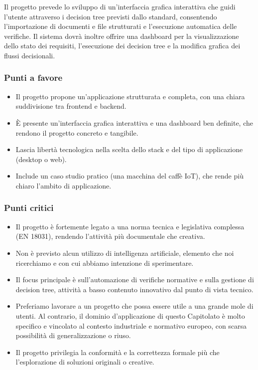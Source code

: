 \documentclass[a4paper,12pt]{article}
\begin{document}
Il progetto prevede lo sviluppo di un’interfaccia grafica interattiva che guidi l’utente attraverso i decision tree previsti dallo standard, consentendo l’importazione di documenti e file strutturati e l’esecuzione automatica delle verifiche. Il sistema dovrà inoltre offrire una dashboard per la visualizzazione dello stato dei requisiti, l’esecuzione dei decision tree e la modifica grafica dei flussi decisionali.

\subsubsection{Punti a favore}
\begin{itemize}
    \item Il progetto propone un’applicazione strutturata e completa, con una chiara suddivisione tra frontend e backend.
    \item È presente un’interfaccia grafica interattiva e una dashboard ben definite, che rendono il progetto concreto e tangibile.
    \item Lascia libertà tecnologica nella scelta dello stack e del tipo di applicazione (desktop o web).
    \item Include un caso studio pratico (una macchina del caffè IoT), che rende più chiaro l’ambito di applicazione.
\end{itemize}

\subsubsection{Punti critici}
\begin{itemize}
    \item Il progetto è fortemente legato a una norma tecnica e legislativa complessa (EN 18031), rendendo l’attività più documentale che creativa.
    \item Non è previsto alcun utilizzo di intelligenza artificiale, elemento che noi ricerchiamo e con cui abbiamo intenzione di sperimentare.
    \item Il focus principale è sull’automazione di verifiche normative e sulla gestione di decision tree, attività a basso contenuto innovativo dal punto di vista tecnico.
    \item Preferiamo lavorare a un progetto che possa essere utile a una grande mole di utenti. Al contrario, il dominio d’applicazione di questo Capitolato è molto specifico e vincolato al contesto industriale e normativo europeo, con scarsa possibilità di generalizzazione o riuso.
    \item Il progetto privilegia la conformità e la correttezza formale più che l’esplorazione di soluzioni originali o creative.
\end{itemize}
\end{document}
